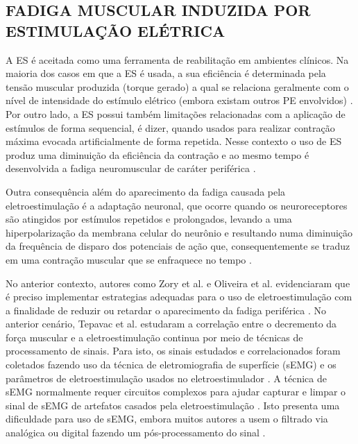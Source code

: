 \subsection{FADIGA MUSCULAR INDUZIDA POR ESTIMULAÇÃO ELÉTRICA}
A \acrshort{ES} é aceitada como uma ferramenta de reabilitação em ambientes clínicos. Na maioria dos casos em que a \acrshort{ES} é usada, a sua eficiência é determinada pela tensão muscular produzida (torque gerado) a qual se relaciona geralmente com o nível de intensidade do estímulo elétrico (embora existam outros \acrshort{PE} envolvidos) \cite{Babault2007EffectsPlayers}. Por outro lado, a \acrshort{ES} possui também limitações relacionadas com a aplicação de estímulos de forma sequencial, é dizer, quando usados para realizar contração máxima evocada artificialmente de forma repetida. Nesse contexto o uso de \acrshort{ES} produz uma diminuição da eficiência da contração e ao mesmo tempo é desenvolvida a fadiga neuromuscular de caráter periférica \cite{Zory2005CentralElectromyostimulation}.

Outra consequência além do aparecimento da fadiga causada pela eletroestimulação é a adaptação neuronal, que ocorre quando os neuroreceptores são atingidos por estímulos repetidos e prolongados, levando a uma hiperpolarização da membrana celular do neurônio e resultando numa diminuição da frequência de disparo dos potenciais de ação que, consequentemente se traduz em uma contração muscular que se enfraquece no tempo \cite{EssenVan1973TheLeech, Moore1994ASignals}.

No anterior contexto, autores como Zory et al. e Oliveira et al. evidenciaram que é preciso implementar estrategias adequadas para o uso de eletroestimulação com a finalidade de reduzir ou retardar o aparecimento da fadiga periférica \cite{DeOliveira2018NeuromuscularAdults, Zory2005CentralElectromyostimulation}. No anterior cenário, Tepavac et al. estudaram a correlação entre o decremento da força muscular e a eletroestimulação continua por meio de técnicas de processamento de sinais. Para isto, os sinais estudados e correlacionados foram coletados fazendo uso da técnica de eletromiografia de superfície (\acrshort{sEMG}) e os parâmetros de eletroestimulação usados no eletroestimulador \cite{Tepavac1997DetectionFatigue}. A técnica de \acrshort{sEMG} normalmente requer circuitos complexos para ajudar capturar e limpar o sinal de \acrshort{sEMG} de artefatos casados pela eletroestimulação \cite{Tepavac1997DetectionFatigue}. Isto presenta uma dificuldade para uso de \acrshort{sEMG}, embora muitos autores a usem o filtrado via analógica ou digital fazendo um pós-processamento do sinal \cite{Li2014MuscleNeuroprosthetics, Zhang2011FES-inducedTracking, Madeleine2001MechanomyographyContractions}.

